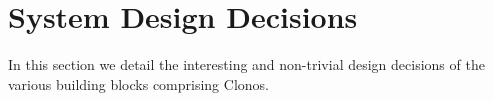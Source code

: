 \documentclass[sigconf]{acmart}
\newcounter{PedroNOC}
\newcommand{\pedro}[1]{\noindent\textcolor{green}{\small \bf [Pedro\#\arabic{PedroNOC}\stepcounter{PedroNOC}: #1]}}
\begin{document}












\section{System Design Decisions}
\label{sec:design}

In this section we detail the interesting and non-trivial design decisions of the various building blocks comprising Clonos. 
\end{document}
